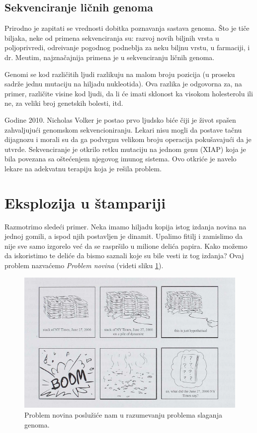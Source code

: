 \subsection{Sekvenciranje ličnih genoma}

Prirodno je zapitati se vrednosti dobitka poznavanja sastava genoma. \v Sto je ti\v ce biljaka, neke od primena sekvenciranja su: razvoj novih biljnih vrsta u poljoprivredi, odre\dj ivanje pogodnog podneblja za neku biljnu vrstu, u farmaciji, i dr. Me\dj utim, najzna\v cajnija primena je u sekvenciranju li\v cnih genoma.

Genomi se kod različitih ljudi razlikuju na malom broju pozicija (u proseku sadrže jednu mutaciju na hiljadu nukleotida). Ova razlika je odgovorna za, na primer, različite visine kod ljudi, da li će imati sklonost ka visokom holesterolu ili ne, za veliki broj genetskih bolesti, itd.

Godine 2010. Nicholas Volker je postao prvo ljudsko biće čiji je život spašen zahvaljujući genomskom sekvencioniranju. Lekari nisu mogli da postave tačnu dijagnozu i morali su da ga podvrgnu velikom broju operacija pokušavajući da je utvrde. Sekvenciranje je otkrilo retku mutaciju na jednom genu (XIAP) koja je bila povezana sa oštećenjem njegovog imunog sistema. Ovo otkriće je navelo lekare na adekvatnu terapiju koja je rešila problem.

\section{Eksplozija u štampariji}

Razmotrimo slede\'ci primer. Neka imamo hiljadu kopija istog izdanja novina na jednoj gomili, a ispod njih postavljen je dinamit. Upalimo fitilj i zamislimo da nije sve samo izgorelo već da se raspršilo u milione delića papira. Kako možemo da iskoristimo te deliće da bismo saznali koje su bile vesti iz tog izdanja? Ovaj problem nazvaćemo \emph{Problem novina} (videti sliku \ref{slika:eksplozija}). 

\begin{figure}[h]
	\centering
	\includegraphics[width=1\textwidth]{poglavlja/3/slike/eksplozija.png}
	\caption{Problem novina poslužiće nam u razumevanju problema slaganja genoma.}
	\label{slika:eksplozija}
\end{figure} 

